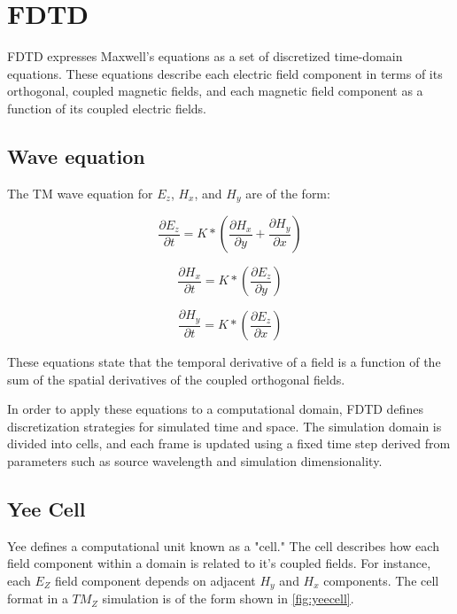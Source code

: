 
\chapter{FDTD} \label{ch:fdtd}


FDTD expresses Maxwell's equations as a set of discretized time-domain equations\cite{Yee}. These equations describe each electric field component in terms of its orthogonal, coupled magnetic fields, and each magnetic field component as a function of its coupled electric fields.


\section{Wave equation}

The TM wave equation for  $E_z$, $H_x$, and $H_y$ are of the form:

\begin{equation} \label{eq:waveequation} 
\frac{\partial E_z}{\partial t} = K * (\frac{\partial H_x}{\partial y} + \frac{\partial H_y}{\partial x})
\end{equation}

\begin{equation}
\frac{\partial H_x}{\partial t} = K * (\frac{\partial E_z}{\partial y})
\end{equation}

\begin{equation}
\frac{\partial H_y}{\partial t} = K * (\frac{\partial E_z}{\partial x})
\end{equation}

These equations state that the temporal derivative of a field is a function of the sum of the spatial derivatives of the coupled orthogonal fields.

In order to apply these equations to a computational domain, FDTD defines discretization strategies for simulated time and space. The simulation domain is divided into cells, and each frame is updated using a fixed time step derived from parameters such as source wavelength and simulation dimensionality.

\section{Yee Cell}

Yee \cite{Yee} defines a computational unit known as a "cell." The cell describes how each field component within a domain is related to it's coupled fields. For instance, each $E_Z$ field component depends on adjacent $H_y$ and $H_x$ components. The cell format in a $TM_Z$ simulation is of the form shown in \autoref{fig:yeecell}.


